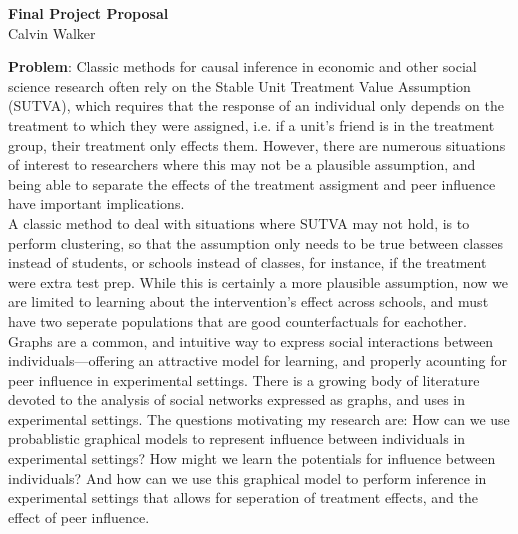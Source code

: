 \documentclass{article}
\begin{document}
\begin{center}
    \textbf{Final Project Proposal} \\[0.25ex]
    Calvin Walker
\end{center}
\textbf{Problem}: Classic methods for causal inference in economic and other social science research often rely on the Stable Unit Treatment Value Assumption (SUTVA), which requires that the response of an individual only depends on the treatment to which they were assigned, i.e. if a unit's friend is in the treatment group, their treatment only effects them. 
However, there are numerous situations of interest to researchers where this may not be a plausible assumption, and being able to separate the effects of the treatment assigment and peer influence have important implications. \\[0.5ex]
A classic method to deal with situations where SUTVA may not hold, is to perform clustering, so that the assumption only needs to be true between classes instead of students, or schools instead of classes, for instance, if the treatment were extra test prep. While this is certainly a more plausible assumption, now we are limited to learning about the intervention's effect across schools, and must have two seperate populations that are good counterfactuals for eachother. \\[0.5ex]
Graphs are a common, and intuitive way to express social interactions between individuals—offering an attractive model for learning, and properly acounting for peer influence in experimental settings. There is a growing body of literature devoted to the analysis of social networks expressed as graphs, and uses in experimental settings. The questions motivating my research are: How can we use probablistic graphical models to represent influence between individuals in experimental settings? How might we learn the potentials for influence between individuals? And how can we use this graphical model to perform inference in experimental settings that allows for seperation of treatment effects, and the effect of peer influence.\\[1.0ex]  
\end{document}
